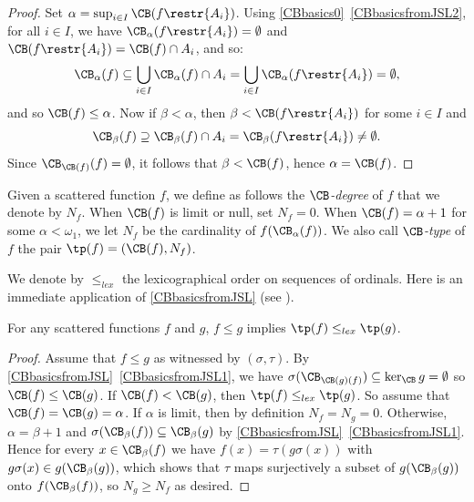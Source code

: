 \begin{proof}
Set $\alpha=\sup_{i\in I}\CB(f\restr{A_i})$. Using \cref{CBbasics0}~\cref{CBbasicsfromJSL2}, for all $i\in I$, we have $\CB_\alpha(f\restr{A_i})=\emptyset$ and 
 $\CB(f\restr{A_i})=\CB(f)\cap A_i$, and so: 
\[\CB_\alpha(f)\subseteq\bigcup_{i\in I}\CB_\alpha(f)\cap A_i=\bigcup_{i\in I}\CB_\alpha(f\restr{A_i})=\emptyset,\]
and so $\CB(f)\leq\alpha$. Now if $\beta<\alpha$, then $\beta<\CB(f\restr{A_i})$ for some ${i\in I}$ and
\[\CB_\beta(f)\supseteq\CB_\beta(f)\cap A_i=\CB_\beta(f\restr{A_i})\neq\emptyset.\]
Since $\CB_{\CB(f)}(f)=\emptyset$, it follows that $\beta<\CB(f)$, hence $\alpha=\CB(f)$.
\end{proof}

Given a scattered function $f$, we define as follows the \emph{$\CB$-degree} of $f$ that we denote by $N_f$. When $\CB(f)$ is limit or null, set $N_f=0$.
When $\CB(f)=\alpha+1$ for some $\alpha<\omega_1$, we let $N_f$ be the cardinality of $f(\CB_\alpha(f))$. 
We also call \emph{$\CB$-type} of $f$ the pair $\tp(f)=(\CB(f),N_f)$. 

We denote by $\leq_{lex}$ the lexicographical order on sequences of ordinals. Here is an immediate application of \cref{CBbasicsfromJSL} (see \cite[Fact, p. 642]{carroy2013quasi}).

\begin{corollary}\label{CBbasicsfromJSL-tp}
For any scattered functions $f$ and $g$, $f\leq g$ implies $\tp(f)\leq_{lex}\tp(g)$.
\end{corollary}
\begin{proof}
Assume that $f\leq g$ as witnessed by $(\sigma,\tau)$. By \cref{CBbasicsfromJSL}~\cref{CBbasicsfromJSL1}, we have $\sigma(\CB_{\CB(g)(f)})\subseteq \ker_{\CB} g=\emptyset$ so $\CB(f)\leq \CB(g)$. If $\CB(f)<\CB(g)$, then $\tp(f)\leq_{lex}\tp(g)$. So assume that $\CB(f)=\CB(g)=\alpha$. If $\alpha$ is limit, then by definition $N_f=N_g=0$. Otherwise, $\alpha=\beta+1$ and $\sigma(\CB_\beta(f))\subseteq \CB_\beta(g)$ by \cref{CBbasicsfromJSL}~\cref{CBbasicsfromJSL1}. 
Hence for every $x\in \CB_\beta(f)$ we have $f(x)=\tau ( g\sigma(x))$ with $g\sigma(x)\in g(\CB_\beta(g))$,
which shows that $\tau$ maps surjectively a subset of $g(\CB_\beta(g))$ onto $f(\CB_\beta(f))$, so $N_g \geq N_f$ as desired.
\end{proof}



